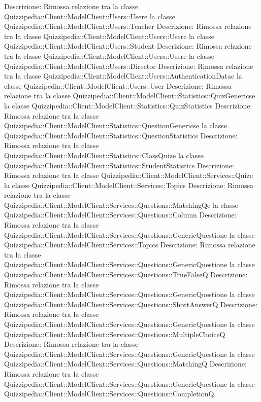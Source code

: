 Descrizione: Rimossa relazione tra la classe Quizzipedia::Client::ModelClient::Users::Usere la classe Quizzipedia::Client::ModelClient::Users::Teacher 
Descrizione: Rimossa relazione tra la classe Quizzipedia::Client::ModelClient::Users::Usere la classe Quizzipedia::Client::ModelClient::Users::Student 
Descrizione: Rimossa relazione tra la classe Quizzipedia::Client::ModelClient::Users::Usere la classe Quizzipedia::Client::ModelClient::Users::Director 
Descrizione: Rimossa relazione tra la classe Quizzipedia::Client::ModelClient::Users::AuthenticationDatae la classe Quizzipedia::Client::ModelClient::Users::User 
Descrizione: Rimossa relazione tra la classe Quizzipedia::Client::ModelClient::Statistics::QuizGenericse la classe Quizzipedia::Client::ModelClient::Statistics::QuizStatistics 
Descrizione: Rimossa relazione tra la classe Quizzipedia::Client::ModelClient::Statistics::QuestionGenericse la classe Quizzipedia::Client::ModelClient::Statistics::QuestionStatistics 
Descrizione: Rimossa relazione tra la classe Quizzipedia::Client::ModelClient::Statistics::ClassQuize la classe Quizzipedia::Client::ModelClient::Statistics::StudentStatistics 
Descrizione: Rimossa relazione tra la classe Quizzipedia::Client::ModelClient::Services::Quize la classe Quizzipedia::Client::ModelClient::Services::Topics 
Descrizione: Rimossa relazione tra la classe Quizzipedia::Client::ModelClient::Services::Questions::MatchingQe la classe Quizzipedia::Client::ModelClient::Services::Questions::Column 
Descrizione: Rimossa relazione tra la classe Quizzipedia::Client::ModelClient::Services::Questions::GenericQuestione la classe Quizzipedia::Client::ModelClient::Services::Topics 
Descrizione: Rimossa relazione tra la classe Quizzipedia::Client::ModelClient::Services::Questions::GenericQuestione la classe Quizzipedia::Client::ModelClient::Services::Questions::TrueFalseQ 
Descrizione: Rimossa relazione tra la classe Quizzipedia::Client::ModelClient::Services::Questions::GenericQuestione la classe Quizzipedia::Client::ModelClient::Services::Questions::ShortAnswerQ 
Descrizione: Rimossa relazione tra la classe Quizzipedia::Client::ModelClient::Services::Questions::GenericQuestione la classe Quizzipedia::Client::ModelClient::Services::Questions::MultipleChoiceQ 
Descrizione: Rimossa relazione tra la classe Quizzipedia::Client::ModelClient::Services::Questions::GenericQuestione la classe Quizzipedia::Client::ModelClient::Services::Questions::MatchingQ 
Descrizione: Rimossa relazione tra la classe Quizzipedia::Client::ModelClient::Services::Questions::GenericQuestione la classe Quizzipedia::Client::ModelClient::Services::Questions::CompletionQ 
